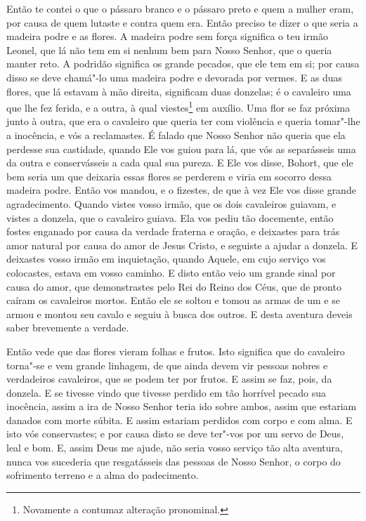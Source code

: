 Então te contei o que o pássaro branco e o pássaro preto e quem a mulher eram,
por causa de quem lutaste e contra quem era. Então preciso te dizer o que seria
a madeira podre e as flores. A madeira podre sem força significa o teu irmão
Leonel, que lá não tem em si nenhum bem para Nosso Senhor, que o queria manter
reto. A podridão significa os grande pecados, que ele tem em si; por causa
disso se deve chamá"-lo uma madeira podre e devorada por vermes. E as duas
flores, que lá estavam à mão direita, significam duas donzelas; é o cavaleiro
uma que lhe fez ferida, e a outra, à qual viestes\footnote{ Novamente a
contumaz alteração pronominal. } em auxílio. Uma flor se faz próxima
junto à outra, que era o cavaleiro que queria ter com violência e queria
tomar"-lhe a inocência, e vós a reclamastes. É falado que Nosso Senhor não
queria que ela perdesse sua castidade, quando Ele vos guiou para lá, que vós as
separásseis uma da outra e conservásseis a cada qual sua pureza. E Ele vos
disse, Bohort, que ele bem seria um que deixaria essas flores se perderem e
viria em socorro dessa madeira podre. Então vos mandou, e o fizestes, de que à
vez Ele vos disse grande agradecimento. Quando vistes vosso irmão, que os dois
cavaleiros guiavam, e vistes a donzela, que o cavaleiro guiava. Ela vos pediu
tão docemente, então fostes enganado por causa da verdade fraterna e oração, e
deixastes para trás amor natural por causa do amor de Jesus Cristo, e seguiste
a ajudar a donzela. E deixastes vosso irmão em inquietação,
quando Aquele, em cujo serviço vos colocastes, estava em vosso caminho. E disto
então veio um grande sinal por causa do amor, que demonstrastes pelo Rei do
Reino dos Céus, que de pronto caíram os cavaleiros mortos. Então ele se soltou
e tomou as armas de um e se armou e montou seu cavalo e seguiu à busca dos
outros. E desta aventura deveis saber brevemente a verdade. 

Então vede que das flores vieram folhas e frutos. Isto significa que do
cavaleiro torna"-se e vem grande linhagem, de que ainda devem vir pessoas nobres
e verdadeiros cavaleiros, que se podem ter por frutos. E assim se faz, pois, da
donzela. E se tivesse vindo que tivesse perdido em tão horrível pecado sua
inocência, assim a ira de Nosso Senhor teria ido sobre ambos, assim que
estariam danados com morte súbita. E assim estariam perdidos com corpo e com
alma. E isto vós conservastes; e por causa disto se deve ter"-vos por um servo
de Deus, leal e bom. E, assim Deus me ajude, não seria vosso serviço tão alta
aventura, nunca vos sucederia que resgatásseis das pessoas de Nosso Senhor, o
corpo do sofrimento terreno e a alma do padecimento.

